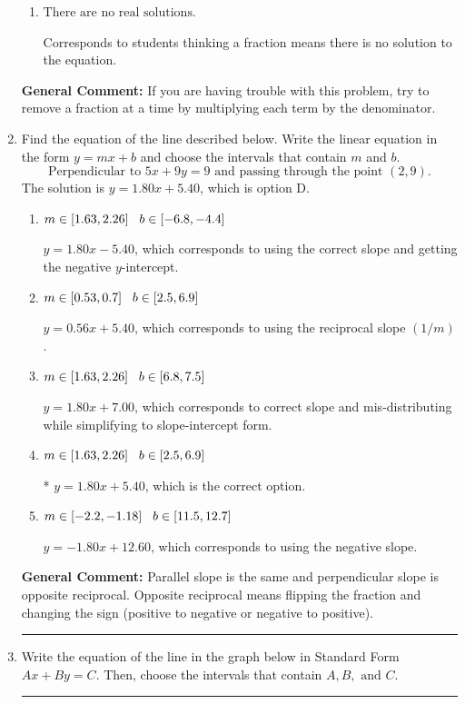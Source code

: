 \documentclass{extbook}[14pt]
\newcommand{\litem}[1]{\item #1

\rule{\textwidth}{0.4pt}}
\begin{document}
\begin{enumerate}
{\begin{enumerate}[label=\Alph*.]
* $x = -13.545$, which is the correct option.
\item \( \text{There are no real solutions.} \)

Corresponds to students thinking a fraction means there is no solution to the equation.
\end{enumerate}

\textbf{General Comment:} If you are having trouble with this problem, try to remove a fraction at a time by multiplying each term by the denominator.
}
\litem{
Find the equation of the line described below. Write the linear equation in the form $ y=mx+b $ and choose the intervals that contain $m$ and $b$.
\[ \text{Perpendicular to } 5 x + 9 y = 9 \text{ and passing through the point } (2, 9). \]The solution is \( y = 1.80x + 5.40 \), which is option D.\begin{enumerate}[label=\Alph*.]
\item \( m \in [1.63, 2.26] \hspace*{3mm} b \in [-6.8, -4.4] \)

 $y = 1.80x - 5.40$, which corresponds to using the correct slope and getting the negative $y$-intercept.
\item \( m \in [0.53, 0.7] \hspace*{3mm} b \in [2.5, 6.9] \)

 $y = 0.56x + 5.40$, which corresponds to using the reciprocal slope $(1/m)$.
\item \( m \in [1.63, 2.26] \hspace*{3mm} b \in [6.8, 7.5] \)

 $y = 1.80x + 7.00$, which corresponds to correct slope and mis-distributing while simplifying to slope-intercept form.
\item \( m \in [1.63, 2.26] \hspace*{3mm} b \in [2.5, 6.9] \)

* $y = 1.80x + 5.40$, which is the correct option.
\item \( m \in [-2.2, -1.18] \hspace*{3mm} b \in [11.5, 12.7] \)

 $y = -1.80x + 12.60$, which corresponds to using the negative slope.
\end{enumerate}

\textbf{General Comment:} Parallel slope is the same and perpendicular slope is opposite reciprocal. Opposite reciprocal means flipping the fraction and changing the sign (positive to negative or negative to positive).
}
\litem{
Write the equation of the line in the graph below in Standard Form $Ax+By=C$. Then, choose the intervals that contain $A, B, \text{ and } C$.

}
\end{enumerate}
\end{document}
